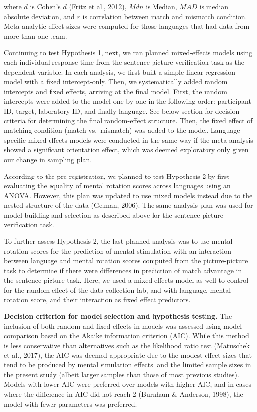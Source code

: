\documentclass[
  man,mask,floatsintext]{apa7}
\begin{document}
where \(d\) is Cohen's \(d\) (Fritz et al., 2012), \(Mdn\) is Median, \(MAD\) is median
absolute deviation, and \(r\) is correlation between match and mismatch
condition. Meta-analytic effect sizes were computed for those languages
that had data from more than one team.

Continuing to test Hypothesis 1, next, we ran planned mixed-effects
models using each individual response time from the sentence-picture
verification task as the dependent variable. In each analysis, we first
built a simple linear regression model with a fixed intercept-only.
Then, we systematically added random intercepts and fixed effects,
arriving at the final model. First, the random intercepts were added to
the model one-by-one in the following order: participant ID, target,
laboratory ID, and finally language. See below section for decision
criteria for determining the final random-effect structure. Then, the
fixed effect of matching condition (match vs.~mismatch) was added to the
model. Language-specific mixed-effects models were conducted in the same
way if the meta-analysis showed a significant orientation effect, which
was deemed exploratory only given our change in sampling plan.

According to the pre-registration, we planned to test Hypothesis 2 by
first evaluating the equality of mental rotation scores across languages
using an ANOVA. However, this plan was updated to use mixed models
instead due to the nested structure of the data (Gelman, 2006). The same
analysis plan was used for model building and selection as described
above for the sentence-picture verification task.

To further assess Hypothesis 2, the last planned analysis was to use
mental rotation scores for the prediction of mental stimulation with an
interaction between language and mental rotation scores computed from
the picture-picture task to determine if there were differences in
prediction of match advantage in the sentence-picture task. Here, we
used a mixed-effects model as well to control for the random effect of
the data collection lab, and with language, mental rotation score, and
their interaction as fixed effect predictors.

\textbf{Decision criterion for model selection and hypothesis testing.} The
inclusion of both random and fixed effects in models was assessed using
model comparison based on the Akaike information criterion (AIC). While
this method is less conservative than alternatives such as the
likelihood ratio test (Matuschek et al., 2017), the AIC was deemed appropriate
due to the modest effect sizes that tend to be produced by mental
simulation effects, and the limited sample sizes in the present study
(albeit larger samples than those of most previous studies). Models with
lower AIC were preferred over models with higher AIC, and in cases where
the difference in AIC did not reach 2 (Burnham \& Anderson, 1998), the model with
fewer parameters was preferred.
\end{document}
